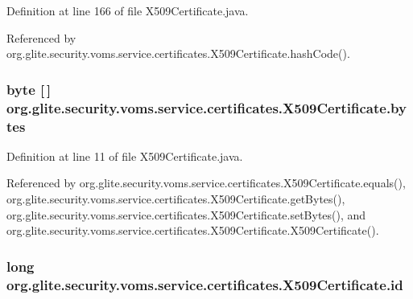 Definition at line 166 of file X509Certificate.java.



Referenced by org.glite.security.voms.service.certificates.X509Certificate.hashCode().

\hypertarget{classorg_1_1glite_1_1security_1_1voms_1_1service_1_1certificates_1_1X509Certificate_a633565ab1518573f1ccd3aafac7c025d}{
\subsubsection[{bytes}]{\setlength{\rightskip}{0pt plus 5cm}byte \mbox{[}$\,$\mbox{]} {\bf org.glite.security.voms.service.certificates.X509Certificate.bytes}}}
\label{classorg_1_1glite_1_1security_1_1voms_1_1service_1_1certificates_1_1X509Certificate_a633565ab1518573f1ccd3aafac7c025d}


Definition at line 11 of file X509Certificate.java.



Referenced by org.glite.security.voms.service.certificates.X509Certificate.equals(), org.glite.security.voms.service.certificates.X509Certificate.getBytes(), org.glite.security.voms.service.certificates.X509Certificate.setBytes(), and org.glite.security.voms.service.certificates.X509Certificate.X509Certificate().

\hypertarget{classorg_1_1glite_1_1security_1_1voms_1_1service_1_1certificates_1_1X509Certificate_adb9d391bfa7d8329d3231f75ee989264}{
\subsubsection[{id}]{\setlength{\rightskip}{0pt plus 5cm}long {\bf org.glite.security.voms.service.certificates.X509Certificate.id}}}
\label{classorg_1_1glite_1_1security_1_1voms_1_1service_1_1certificates_1_1X509Certificate_adb9d391bfa7d8329d3231f75ee989264}



